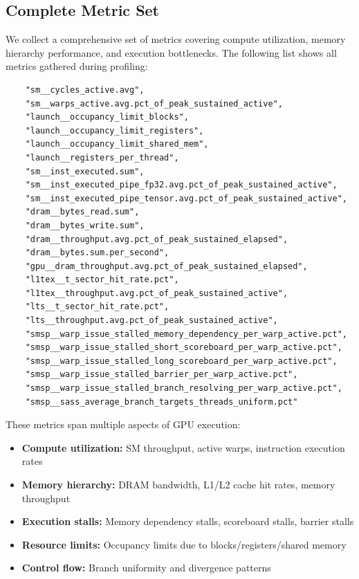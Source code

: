 \subsection{Complete Metric Set}

We collect a comprehensive set of metrics covering compute utilization, memory hierarchy performance, and execution bottlenecks. The following list shows all metrics gathered during profiling:

\begin{mdframed}[linewidth=1pt, linecolor=black, backgroundcolor=gray!5]
\begin{lstlisting}
    "sm__cycles_active.avg",
    "sm__warps_active.avg.pct_of_peak_sustained_active",
    "launch__occupancy_limit_blocks",
    "launch__occupancy_limit_registers",
    "launch__occupancy_limit_shared_mem",
    "launch__registers_per_thread",
    "sm__inst_executed.sum",
    "sm__inst_executed_pipe_fp32.avg.pct_of_peak_sustained_active",
    "sm__inst_executed_pipe_tensor.avg.pct_of_peak_sustained_active",
    "dram__bytes_read.sum",
    "dram__bytes_write.sum",
    "dram__throughput.avg.pct_of_peak_sustained_elapsed",
    "dram__bytes.sum.per_second",
    "gpu__dram_throughput.avg.pct_of_peak_sustained_elapsed",
    "l1tex__t_sector_hit_rate.pct",
    "l1tex__throughput.avg.pct_of_peak_sustained_active",
    "lts__t_sector_hit_rate.pct",
    "lts__throughput.avg.pct_of_peak_sustained_active",
    "smsp__warp_issue_stalled_memory_dependency_per_warp_active.pct",
    "smsp__warp_issue_stalled_short_scoreboard_per_warp_active.pct",
    "smsp__warp_issue_stalled_long_scoreboard_per_warp_active.pct",
    "smsp__warp_issue_stalled_barrier_per_warp_active.pct",
    "smsp__warp_issue_stalled_branch_resolving_per_warp_active.pct",
    "smsp__sass_average_branch_targets_threads_uniform.pct"
\end{lstlisting}
\end{mdframed}

These metrics span multiple aspects of GPU execution:
\begin{itemize}
\item \textbf{Compute utilization:} SM throughput, active warps, instruction execution rates
\item \textbf{Memory hierarchy:} DRAM bandwidth, L1/L2 cache hit rates, memory throughput
\item \textbf{Execution stalls:} Memory dependency stalls, scoreboard stalls, barrier stalls
\item \textbf{Resource limits:} Occupancy limits due to blocks/registers/shared memory
\item \textbf{Control flow:} Branch uniformity and divergence patterns
\end{itemize}


